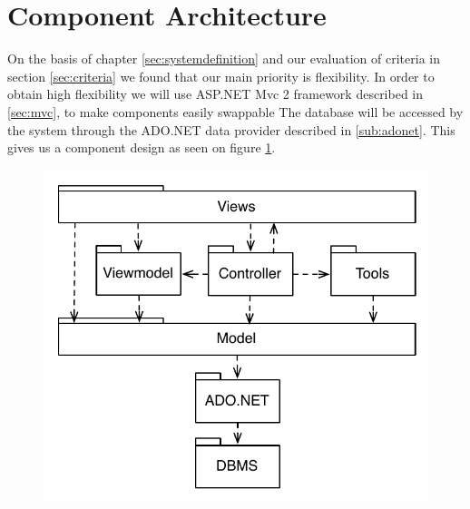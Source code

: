 \section{Component Architecture}
\label{sec:components}
On the basis of chapter \ref{sec:systemdefinition} and our evaluation of criteria in section \ref{sec:criteria} we found that our main priority is flexibility. 
In order to obtain high flexibility we will use ASP.NET Mvc 2 framework described in \ref{sec:mvc}, to make components easily swappable
The database will be accessed by the system through the ADO.NET data provider described in \ref{sub:adonet}. This gives us a component design as seen on figure \ref{fig:system_component_mvc}.

\begin{figure}
	\centering
		\includegraphics[scale=0.8]{input/architectural_design/system_component_mvc.pdf}
	\label{fig:system_component_mvc}
\end{figure}

